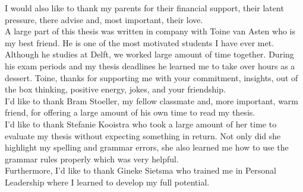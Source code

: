 I would also like to thank my parents for their financial support, their latent
pressure, there advise and, most important, their love.\\

\newpage
A large part of this thesis was written in company with Toine van Asten who is my
best friend. He is one of the most motivated students I have ever met. Although
he studies at Delft, we worked large amount of time together. During his
exam periods and my thesis deadlines he learned me to take over hours as a
dessert.  Toine, thanks for supporting me with your commitment, insights, out of
the box thinking, positive energy, jokes, and your friendship.\\

I'd like to thank Bram Stoeller, my fellow classmate and, more important, warm
friend, for offering a large amount of his own time to read my thesis.\\

I'd like to thank Stefanie Kooistra who took a large amount of her time to
evaluate my thesis without expecting something in return.  Not only did she
highlight my spelling and grammar errors, she also learned me how to use the
grammar rules properly which was very helpful.\\

Furthermore, I'd like to thank Gineke Sietsma who trained me in Personal Leadership 
where I learned to develop my full potential.
